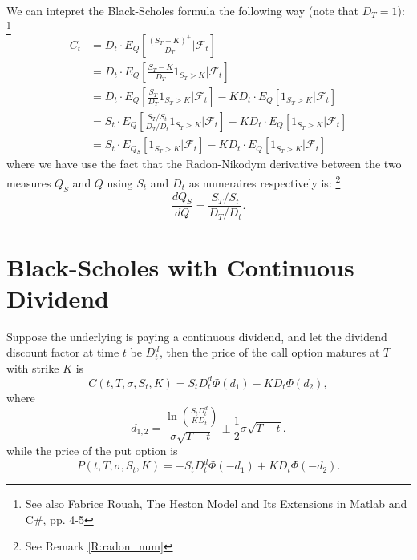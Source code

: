 \begin{remark}
	We can intepret the Black-Scholes formula the following way (note that
	$D_T=1$):
	\footnote{See also Fabrice Rouah, The Heston Model and Its Extensions in 
	Matlab and C\#, pp. 4-5}
	\begin{align*}
		C_t &= D_t \cdot E_Q\left[ \frac{(S_T-K)^+}{D_T}  \bigg| \mathcal{F}_t
	                      \right] \\
   			&= D_t \cdot E_Q\left[ 
 												  \frac{S_T-K}{D_T} 1_{S_T>K} \bigg| \mathcal{F}_t
	                      \right] \\
   			&= D_t \cdot E_Q\left[ 
 												  \frac{S_T}{D_T} 1_{S_T>K} \bigg| \mathcal{F}_t
	                      \right] 
					 - K D_t \cdot E_Q[1_{S_T>K} | \mathcal{F}_t] \\
   			&= S_t \cdot E_Q\left[ 
 												  \frac{S_T/S_t}{D_T/D_t} 1_{S_T>K} \bigg| \mathcal{F}_t
	                      \right] 
					 - K D_t \cdot E_Q[1_{S_T>K} | \mathcal{F}_t] \\
			  &= S_t \cdot E_{Q_S}[1_{S_T>K} | \mathcal{F}_t] 
					 - K D_t \cdot E_Q[1_{S_T>K} | \mathcal{F}_t] 
	\end{align*}
	where we have use the fact that the Radon-Nikodym derivative between the two
	measures $Q_S$ and $Q$ using $S_t$ and $D_t$ as numeraires respectively is:
	\footnote{See Remark \ref{R:radon_num}}
	\[
		\frac{dQ_S}{dQ} = \frac{S_T/S_t}{D_T/D_t}.
	\]
\end{remark}


\section{Black-Scholes with Continuous Dividend}
Suppose the underlying is paying a continuous dividend, and let the dividend
discount factor at time $t$ be $D_t^d$, then the price of the call option
matures at $T$ with strike $K$ is
\begin{equation} \label{E:bs_div}
  C(t,T,\sigma,S_t,K) = S_t D_t^d \Phi(d_1) - K D_t \Phi(d_2),
\end{equation}
where
\[
  d_{1,2}=\frac{\ln\left( \frac{S_t D_t^d}{K D_t} \right)}{\sigma\sqrt{T-t}}
          \pm \frac{1}{2} \sigma\sqrt{T-t}.
\]
while the price of the put option is 
\begin{equation}
  P(t,T,\sigma,S_t,K) = - S_t D_t^d \Phi(-d_1) + K D_t \Phi(-d_2).
\end{equation}

